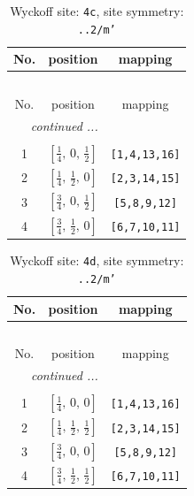 \documentclass[fleqn,8pt]{jsarticle}
\begin{document}
\renewcommand{\arraystretch}{1.2}
\begin{longtable}{ccc}
\caption{Wyckoff site: {\tt 4c}, site symmetry: {\tt ..2/m'}}
 \\
 \hline \hline
No. & position & mapping \\ \hline \endfirsthead

\multicolumn{2}{l}{\tablename\ \thetable{}} \\
 \hline \hline
No. & position & mapping \\ \hline \endhead

 \hline \hline
\multicolumn{2}{r}{\footnotesize\it continued ...} \\ \endfoot

 \hline \hline
\multicolumn{2}{r}{} \\ \endlastfoot

1 & $\left[ \frac{1}{4},\, 0,\, \frac{1}{2} \right]$ & {\tt [1,4,13,16]} \\ \hline
2 & $\left[ \frac{1}{4},\, \frac{1}{2},\, 0 \right]$ & {\tt [2,3,14,15]} \\ \hline
3 & $\left[ \frac{3}{4},\, 0,\, \frac{1}{2} \right]$ & {\tt [5,8,9,12]} \\ \hline
4 & $\left[ \frac{3}{4},\, \frac{1}{2},\, 0 \right]$ & {\tt [6,7,10,11]} \\
\end{longtable}
\renewcommand{\arraystretch}{1.2}
\begin{longtable}{ccc}
\caption{Wyckoff site: {\tt 4d}, site symmetry: {\tt ..2/m'}}
 \\
 \hline \hline
No. & position & mapping \\ \hline \endfirsthead

\multicolumn{2}{l}{\tablename\ \thetable{}} \\
 \hline \hline
No. & position & mapping \\ \hline \endhead

 \hline \hline
\multicolumn{2}{r}{\footnotesize\it continued ...} \\ \endfoot

 \hline \hline
\multicolumn{2}{r}{} \\ \endlastfoot

1 & $\left[ \frac{1}{4},\, 0,\, 0 \right]$ & {\tt [1,4,13,16]} \\ \hline
2 & $\left[ \frac{1}{4},\, \frac{1}{2},\, \frac{1}{2} \right]$ & {\tt [2,3,14,15]} \\ \hline
3 & $\left[ \frac{3}{4},\, 0,\, 0 \right]$ & {\tt [5,8,9,12]} \\ \hline
4 & $\left[ \frac{3}{4},\, \frac{1}{2},\, \frac{1}{2} \right]$ & {\tt [6,7,10,11]} \\
\end{longtable}
\end{document}
